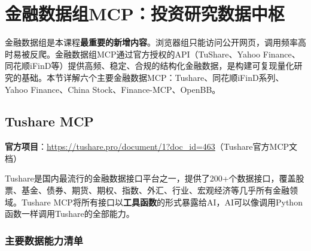 \section{金融数据组MCP：投资研究数据中枢}

金融数据组是本课程\textbf{最重要的新增内容}。浏览器组只能访问公开网页，调用频率高时易被反爬。金融数据组MCP通过官方授权的API（TuShare、Yahoo Finance、同花顺iFinD等）提供高频、稳定、合规的结构化金融数据，是构建可复现量化研究的基础。本节详解六个主要金融数据MCP：Tushare、同花顺iFinD系列、Yahoo Finance、China Stock、Finance-MCP、OpenBB。

\subsection{Tushare MCP}

\textbf{官方项目}：\url{https://tushare.pro/document/1?doc_id=463}（Tushare官方MCP文档）

Tushare是国内最流行的金融数据接口平台之一，提供了200+个数据接口，覆盖股票、基金、债券、期货、期权、指数、外汇、行业、宏观经济等几乎所有金融领域。Tushare MCP将所有接口以\textbf{工具函数}的形式暴露给AI，AI可以像调用Python函数一样调用Tushare的全部能力。

\subsubsection{主要数据能力清单}

